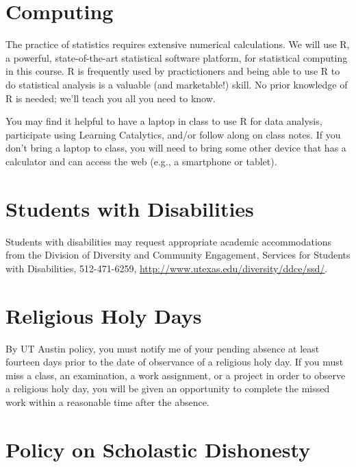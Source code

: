 \documentclass[12pt]{article}
\begin{document}
\section*{Computing}

The practice of statistics requires extensive numerical calculations. We will use R, a powerful, state-of-the-art statistical software platform, for statistical computing in this course.  R is frequently used by practictioners and being able to use R to do statistical analysis is a valuable (and marketable!) skill.  No prior knowledge of R is needed; we'll teach you all you need to know.

You may find it helpful to have a laptop in class to use R for data analysis, participate using Learning Catalytics, and/or follow along on class notes.  If you don't bring a laptop to class, you will need to bring some other device that has a calculator and can access the web (e.g., a smartphone or tablet).

\section*{Students with Disabilities}

Students with disabilities may request appropriate academic accommodations from the Division of Diversity and Community Engagement, Services for Students with Disabilities, 512-471-6259, \url{http://www.utexas.edu/diversity/ddce/ssd/}.

\section*{Religious Holy Days}

By UT Austin policy, you must notify me of your pending absence at least fourteen days prior to the date of observance of a religious holy day.  If you must miss a class, an examination, a work assignment, or a project in order to observe a religious holy day, you will be given an opportunity to complete the missed work within a reasonable time after the absence.

\section*{Policy on Scholastic Dishonesty}
\end{document}
